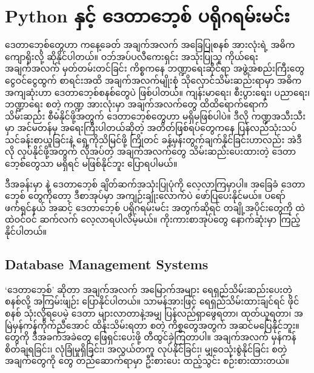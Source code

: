 \chapter{Python နှင့် ဒေတာဘေ့စ် ပရိုဂရမ်းမင်း}

ဒေတာဘေ့စ်တွေဟာ ကနေ့ခေတ် အချက်အလက် အခြေပြုစနစ်  အားလုံးရဲ့ အဓိကကျောရိုးလို့ ဆိုနိုင်ပါတယ်။ ဝဘ်အပ်ပလီကေးရှင်း အသုံးပြုသူ ကိုယ်ရေးအချက်အလက် မှတ်တမ်းတင်ခြင်း ကိစ္စကနေ ဘဏ္ဍာရေးဆိုင်ရာ အဖွဲ့အစည်းကြီးတွေ ငွေဝင်ငွေထွက် စာရင်းအထိ အချက်အလက်မျိုးစုံ သိုလှောင်သိမ်းဆည်းရာမှာ အဓိကအကျဆုံးဟာ ဒေတာဘေ့စ်စနစ်တွေပဲ ဖြစ်ပါတယ်။ ကျန်းမာရေး၊ စီးပွားရေး၊ ပညာရေး၊ ဘဏ္ဍာရေး စတဲ့ ကဏ္ဍ အားလုံးမှာ အချက်အလက်တွေ ထိထိရောက်ရောက် သိမ်း\allowbreak ဆည်း စီမံနိုင်ဖို့အတွက် ဒေတာဘေ့စ်တွေဟာ မရှိမဖြစ်ပါပဲ။ ဒီလို ကဏ္ဍအသီးသီးမှာ အင်မတန်မှ အရေး\allowbreak ကြီးပါတယ်ဆိုတဲ့ အတိတ်ဖြစ်ရပ်တွေကနေ ပြန်လည်သုံးသပ် သင်ခန်းစာယူခြင်းနဲ့ ရှေ့ကိုသိမြင်ဖို့ ကြိုတင် ခန့်မှန်းတွက်ချက်နိုင်ခြင်းဟာလည်း အဲဒီလို လုပ်နိုင်ဖို့အတွက် လိုအပ်တဲ့ အချက်အလက်တွေ သိမ်းဆည်းပေးထားတဲ့ ဒေတာဘေ့စ်တွေသာ မရှိရင် မဖြစ်နိုင်ဘူး ပြောရပါမယ်။  

ဒီအခန်းမှာ  နဲ့ ဒေတာဘေ့စ် ချိတ်ဆက်အသုံးပြုပုံကို လေ့လာကြမှာပါ။ အခြေ\allowbreak ခံ ဒေတာဘေ့စ်  တွေကိုတော့ ဒီစာအုပ်မှာ အကျဉ်းချုံးလောက်ပဲ ဖော်ပြပေးနိုင်မယ်။ ပရော်ဖက်ရှင်နယ် အဆင့် ဒေတာဘေ့စ် ပရိုဂရမ်းမင်း အတွက်ဆိုရင် တချို့အပိုင်းတွေကို ထဲထဲဝင်ဝင် ဆက်လက် လေ့လာရပါလိမ့်မယ်။ ကိုးကားစာအုပ်တွေ နောက်ဆုံးမှာ ကြည့်နိုင်ပါတယ်။


\section{Database Management Systems}
‘ဒေတာဘေ့စ်’ ဆိုတာ အချက်အလက် အမြောက်အများ ရေရှည်သိမ်းဆည်းပေးတဲ့ စနစ်လို့ အကြမ်းဖျဉ်း ပြောနိုင်ပါတယ်။ သာမန်အားဖြင့် ရေရှည်သိမ်းထားချင်ရင် ဖိုင်စနစ် သုံးလို့ရပေမဲ့ ဒေတာ များလာတာနဲ့အမျှ ပြန်လည်ရှာဖွေရတာ၊ ထုတ်ယူရတာ၊ အမြဲမှန်ကန်ကိုက်ညီအောင် ထိန်းသိမ်းရတာ စတဲ့ ကိစ္စတွေအတွက် အဆင်မပြေနိုင်ဘူး။  တွေကို ဒီအခက်အခဲတွေ ဖြေရှင်းပေးဖို့  တီထွင်ခဲ့ကြတာပါ။ အချက်အလက် မှန်ကန်စိတ်ချရခြင်း၊ လုံခြုံမှုရှိခြင်း၊ အလွယ်တကူ  လုပ်နိုင်ခြင်း၊ မျှဝေသုံးစွဲနိုင်ခြင်း စတဲ့အချက်တွေကို  တွေ တည်ဆောက်ရာမှာ ဦးစားပေး ထည့်သွင်း စဉ်းစားထားတယ်။  

